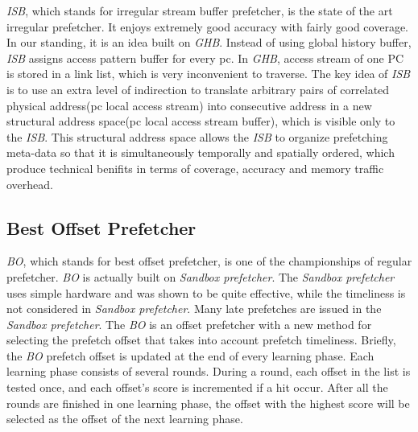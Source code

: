   \emph{ISB}, which stands for irregular stream buffer prefetcher, is the state of the art irregular prefetcher. It enjoys extremely good accuracy with fairly good coverage. In our standing, it is an idea built on \emph{GHB}\cite{ghbpaper}. Instead of using global history buffer, \emph{ISB} assigns access pattern buffer for every pc. In \emph{GHB}, access stream of one PC is stored in a link list, which is very inconvenient to traverse. The key idea of \emph{ISB} is to use an extra level of indirection to translate arbitrary pairs of correlated physical address(pc local access stream) into consecutive address in a new structural address space(pc local access stream buffer), which is visible only to the \emph{ISB}. This structural address space allows the \emph{ISB} to organize prefetching meta-data so that it is simultaneously temporally and spatially ordered, which produce technical benifits in terms of coverage, accuracy and memory traffic overhead.

  \subsection{Best Offset Prefetcher}
  \label{sec:bointro}

  \emph{BO}, which stands for best offset prefetcher, is one of the championships of regular prefetcher. \emph{BO} is actually built on \emph{Sandbox prefetcher}\cite{sandboxpaper}. The \emph{Sandbox prefetcher} uses simple hardware and was shown to be quite effective, while the timeliness is not considered in \emph{Sandbox prefetcher}. Many late prefetches are issued in the \emph{Sandbox prefetcher}. The \emph{BO} is an offset prefetcher with a new method for selecting the prefetch offset that takes into account prefetch timeliness. Briefly, the \emph{BO} prefetch offset is updated at the end of every learning phase. Each learning phase consists of several rounds. During a round, each offset in the list is tested once, and each offset's score is incremented if a hit occur. After all the rounds are finished in one learning phase, the offset with the highest score will be selected as the offset of the next learning phase.

